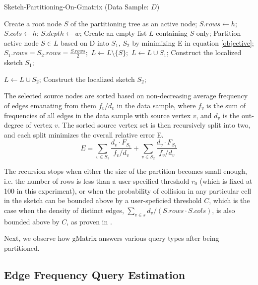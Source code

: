 \begin{algorithm}
\caption{Sketch-Partitioning-On-Gmatrix (Data Sample: $D$)}\label{gmat}
\begin{algorithmic}[1]

\State Create a root node $S$ of the partitioning tree as an
active node;
\State $S.rows \gets h$;
\State $S.cols \gets h$;
\State $S.depth \gets w$;
\State Create an empty list $L$ containing $S$ only;
\State Partition active node $S \in L$ based on D into $S_1$, $S_2$ by minimizing E in equation \ref{objective};
\State $S_1.rows = S_2.rows = \frac{S.rows}{2};$
\State $L \gets L \setminus \{ S \};$
\State $L \gets L \cup S_1$;
\Else
\State Construct the localized sketch $S_1$;
\EndIf

\State $L \gets L \cup S_2$;
\Else
\State Construct the localized sketch $S_2$;
\EndIf

\EndWhile

\end{algorithmic}
\end{algorithm}

The selected source nodes are sorted based on non-decreasing average frequency of edges emanating from them $f_v/d_v$ in the data sample, where $f_v$ is the sum of frequencies of all edges in the data sample with source vertex $v$, and $d_v$ is the out-degree of vertex $v$. The sorted source vertex set is then recursively split into two, and each split minimizes the overall relative error E.
\[
E = \sum_{v \in S_1} \frac{d_v \cdot F_{S_1}}{f_v / d_v} + \sum_{v \in S_2} \frac{d_v \cdot F_{S_1}}{f_v / d_v}
\]

The recursion stops when either the size of the partition becomes small enough, i.e. the number of rows is less than a user-specified threshold $r_0$ (which is fixed at 100 in this experiment), or when the probability of collision in any particular cell in the sketch can be bounded above by a user-speficied threshold $C$, which is the case when the density of distinct edges, $\sum_{v \in s} d_v/(S.rows \cdot S.cols)$, is also bounded above by $C$, as proven in \cite{DBLP}.

Next, we observe how gMatrix answers various query types after being partitioned.

\subsection{Edge Frequency Query Estimation}

